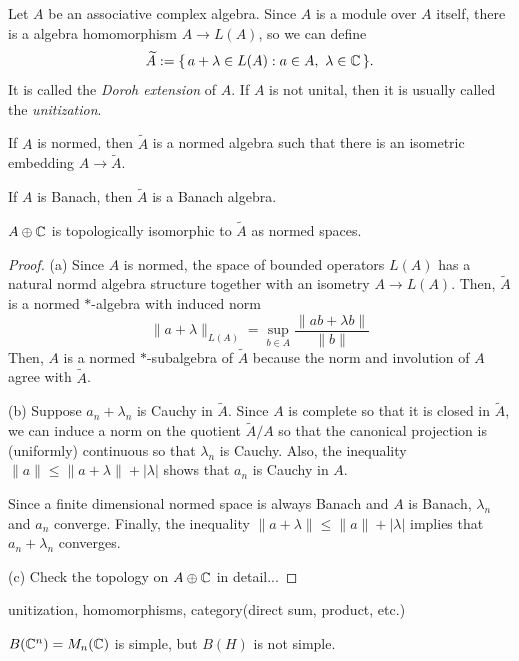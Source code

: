 \documentclass{../../large}
\begin{document}
\begin{prb}[Unitization]
Let $A$ be an associative complex algebra.
Since $A$ is a module over $A$ itself, there is a algebra homomorphism $A\to L(A)$, so we can define
\[\widetilde A:=\{\,a+\lambda\in L(A):a\in A,\ \lambda\in\mathbb{C}\,\}.\]
It is called the \emph{Doroh extension} of $A$.
If $A$ is not unital, then it is usually called the \emph{unitization}.
\begin{parts}
\item If $A$ is normed, then $\tilde A$ is a normed algebra such that there is an isometric embedding $A\to\tilde A$.
\item If $A$ is Banach, then $\tilde A$ is a Banach algebra.
\item $A\oplus\mathbb{C}$ is topologically isomorphic to $\tilde A$ as normed spaces.
\end{parts}
\end{prb}
\begin{proof}
(a)
Since $A$ is normed, the space of bounded operators $L(A)$ has a natural normd algebra structure together with an isometry $A\to L(A)$.
Then, $\tilde A$ is a normed $*$-algebra with induced norm
\[\|a+\lambda\|_{L(A)}=\sup_{b\in A}\frac{\|ab+\lambda b\|}{\|b\|}\]
Then, $A$ is a normed $*$-subalgebra of $\tilde A$ because the norm and involution of $A$ agree with $\tilde A$.

(b)
Suppose $a_n+\lambda_n$ is Cauchy in $\tilde A$.
Since $A$ is complete so that it is closed in $\tilde A$, we can induce a norm on the quotient $\tilde A/A$ so that the canonical projection is (uniformly) continuous so that $\lambda_n$ is Cauchy.
Also, the inequality $\|a\|\le\|a+\lambda\|+|\lambda|$ shows that $a_n$ is Cauchy in $A$.

Since a finite dimensional normed space is always Banach and $A$ is Banach, $\lambda_n$ and $a_n$ converge.
Finally, the inequality $\|a+\lambda\|\le\|a\|+|\lambda|$ implies that $a_n+\lambda_n$ converges.

(c)
Check the topology on $A\oplus\mathbb{C}$ in detail...
\end{proof}



unitization, homomorphisms, category(direct sum, product, etc.)

$B(\mathbb{C}^n)=M_n(\mathbb{C})$ is simple, but $B(H)$ is not simple.

\end{document}
